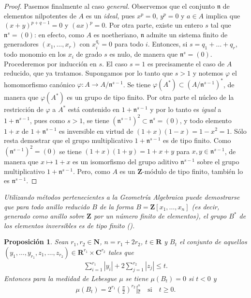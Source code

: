 \documentclass[oneside,bibtotoc,leqno,spanish]{amsbook}
\newcommand{\RR}{\mathbf{R}}
\newcommand{\ZZ}{\mathbf{Z}}
\newcommand{\NN}{\mathbf{N}}
\newcommand{\CC}{\mathbf{C}}
\newcommand{\idl}[1]{\mathfrak{#1}}
\newcommand{\QED}{}%
\newcommand{\abs}[1]{\left\lvert#1\right\rvert}
\renewcommand{\to}[1][]{\xrightarrow{#1}}
\numberwithin{equation}{section}
\newenvironment{comm}%
	{\begin{trivlist}\item\small\itshape}
	{\end{trivlist}}
\theoremstyle{defi}
\theoremstyle{note}
\newtheorem*{proposition*}{Proposici\'on}
\theoremstyle{rem}
\numberwithin{theorem}{section}
\numberwithin{proposition}{section}
\numberwithin{definition}{section}
\numberwithin{lemma}{section}
\numberwithin{corollary}{section}
\numberwithin{example}{section}
\numberwithin{footnote}{section}%
\begin{document}
\begin{proof}
Pasemos finalmente al caso {\em general.} Observemos que el conjunto $\idl{n}$ de elementos nilpotentes de $A$
es un {\em ideal,} pues $x^{p}=0$, $y^{p}=0$ y $a\in A$ implica que $(x+y)^{p+q-1}=0$ y $(ax)^{p}=0$. Por otra parte,
existe un entero $s$ tal que $\idl{n}^{s}=(0)$: en efecto, como $A$ es noetheriano, $\idl{n}$ admite un sistema
finito de generadores $(x_{1},\dots,x_{r})$ con $x_{i}^{q_{i}}=0$ para todo $i$. Entonces, si $s = q_{1}+\dots+q_{r}$,
todo monomio en los $x_{i}$ de grado $s$ es nulo, de manera que $\idl{n}^{s}=(0)$. Procederemos por inducci\'on
en $s$. El caso $s=1$ es precisamente el caso de $A$ reducido, que ya tratamos. Supongamos por lo tanto que
$s>1$ y notemos $\varphi$ el homomorfismo can\'onico $\varphi:A\to A/\idl{n}^{s-1}$. Se tiene
$\varphi(A^{*})\subset(A/\idl{n}^{s-1})^{*}$, de manera que $\varphi(A^{*})$ es un grupo de tipo finito. Por
otra parte el n\'ucleo de la restricci\'on de $\varphi$ a $A^{*}$ est\'a contenido en $1+\idl{n}^{s-1}$ y
por lo tanto es {\em igual} a $1+\idl{n}^{s-1}$, pues como $s>1$, se tiene $(\idl{n}^{s-1})^{2}\subset\idl{n}^{s}=(0)$,
y todo elemento $1+x$ de $1+\idl{n}^{s-1}$ es inversible en virtud de
$(1+x)(1-x) = 1-x^{2}=1$. S\'olo resta demostrar que el grupo multiplicativo $1+\idl{n}^{s-1}$ es de tipo finito.
Como $(\idl{n}^{s-1})^{2}=(0)$ se tiene $(1+x)(1+y) = 1+x+y$ para $x,y\in\idl{n}^{s-1}$, de manera que
$x\mapsto 1+x$ es un isomorfismo del grupo aditivo $\idl{n}^{s-1}$ sobre el grupo multiplicativo $1+\idl{n}^{s-1}$.
Pero, como $A$ es un $\ZZ$-m\'odulo de tipo finito, tambi\'en lo es $\idl{n}^{s-1}$. \QED
\end{proof}

\begin{comm}
Utilizando m\'etodos pertenecientes a la Geometr\'ia Algebraica puede demostrarse que para todo anillo
{\em reducido} $B$ de la forma $B = \ZZ[x_{1},\dots,x_{n}]$ (es decir, generado como anillo sobre $\ZZ$ por un
n\'umero finito de elementos), el grupo $B^{*}$ de los elementos inversibles es de tipo finito (\cite{Samuel1}).
\end{comm}


\begin{proposition*}
Sean $r_{1},r_{2}\in\NN$, $n=r_{1}+2r_{2}$, $t\in\RR$ y $B_{t}$ el conjunto de aquellos
$(y_{1},\dots,y_{r_{1}},z_{1},\dots,z_{r_{2}})\in\RR^{r_{1}}\times\CC^{r_{2}}$ tales que
\begin{gather}
\sum_{i=1}^{r_{1}}\abs{y_{i}}+2\sum_{j=1}^{r_{2}}\abs{z_{j}}\leq t.
\end{gather}
Entonces para la medidad de Lebesgue $\mu$ se tiene $\mu(B_{t})=0$ si $t < 0$ y
\begin{gather}\label{eq-4-ap-2}
\mu(B_{t}) = 2^{r_{1}}\left(\frac{\pi}{2}\right)^{r_{2}}\frac{t^{n}}{n!}\quad\text{si}\quad t\geq 0.
\end{gather}
\end{proposition*}
\end{document}
